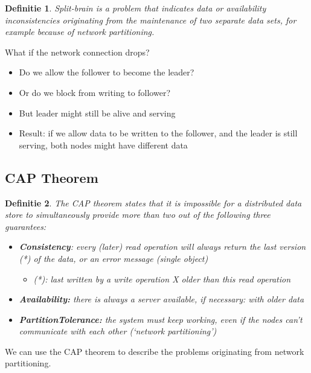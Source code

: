 \documentclass{article}
\newtheorem{theorem}{Definitie}[section]
\begin{document}
\begin{theorem}
    Split-brain is a problem that indicates data or availability inconsistencies
    originating from the maintenance of two separate data sets, for example because
    of network partitioning.
\end{theorem}

What if the network connection drops?

\begin{itemize}
    \item Do we allow the follower to become the leader?
    \item Or do we block from writing to follower?
    \item But leader might still be alive and serving
    \item Result: if we allow data to be written to the follower, and the leader is still serving, both nodes might have different data
\end{itemize}

\subsection{CAP Theorem}

\begin{theorem}
    The CAP theorem states that it is impossible for a distributed data store to 
    simultaneously provide more than two out of the following three guarantees: 

\begin{itemize}
    \item \textbf{Consistency}: every (later) read operation will always return the last version (*) of the data, or an error message (single object)
    \begin{itemize}
        \item (*): last written by a write operation X older than this read operation
    \end{itemize}
    \item \textbf{Availability:} there is always a server available, if necessary: with older data
    \item \textbf{PartitionTolerance:} the system must keep working, even if the nodes can't communicate with each other (`network partitioning')
\end{itemize}
\end{theorem}

We can use the CAP theorem to describe the problems originating from network partitioning.
\end{document}
